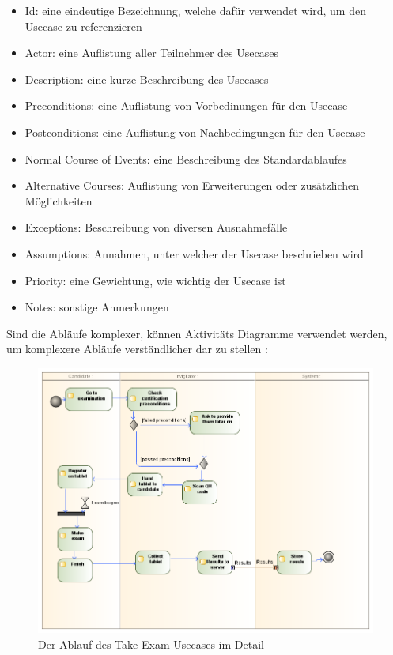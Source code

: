 \begin{itemize}
  \item Id: eine eindeutige Bezeichnung, welche dafür verwendet wird, um den Usecase zu referenzieren
  \item Actor: eine Auflistung aller Teilnehmer des Usecases
  \item Description: eine kurze Beschreibung des Usecases
  \item Preconditions: eine Auflistung von Vorbedinungen für den Usecase
  \item Postconditions: eine Auflistung von Nachbedingungen für den Usecase
  \item Normal Course of Events: eine Beschreibung des Standardablaufes
  \item Alternative Courses: Auflistung von Erweiterungen oder zusätzlichen Möglichkeiten
  \item Exceptions: Beschreibung von diversen Ausnahmefälle
  \item Assumptions: Annahmen, unter welcher der Usecase beschrieben wird
  \item Priority: eine Gewichtung, wie wichtig der Usecase ist
  \item Notes: sonstige Anmerkungen
\end{itemize}

Sind die Abläufe komplexer, können Aktivitäts Diagramme verwendet werden, um komplexere Abläufe verständlicher dar zu stellen \cite[S. 215]{reqman}:

\begin{figure}[H]
    \centering
    \includegraphics[scale=0.4]{uml/takeexamreq.png}
    \caption{Der Ablauf des Take Exam Usecases im Detail}
\end{figure}

